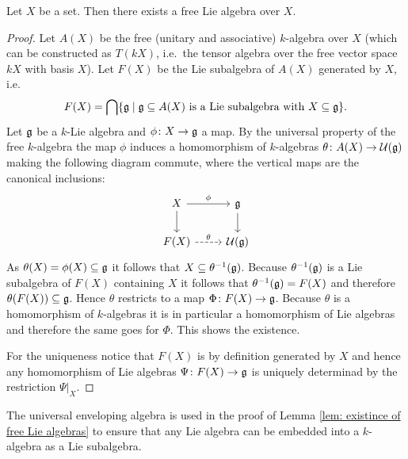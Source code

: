 \begin{lem}\label{lem: existince of free Lie algebras}
 Let $X$ be a set. Then there exists a free Lie algebra over $X$.
\end{lem}
\begin{proof}
 Let $A(X)$ be the free (unitary and associative) $k$-algebra over $X$ (which can be constructed as $T(kX)$, i.e.\ the tensor algebra over the free vector space $kX$ with basis $X$). Let $F(X)$ be the Lie subalgebra of $A(X)$ generated by $X$, i.e.
 \[
  F(X) = \bigcap \{\mathfrak{g} \mid \text{$\mathfrak{g} \subseteq A(X)$ is a Lie subalgebra with $X \subseteq \mathfrak{g}$}\}.
 \]
 Let $\mathfrak{g}$ be a $k$-Lie algebra and $\phi \colon X \to \mathfrak{g}$ a map. By the universal property of the free $k$-algebra the map $\phi$ induces a homomorphism of $k$-algebras $\theta \colon A(X) \to \mathcal{U}(\mathfrak{g})$ making the following diagram commute, where the vertical maps are the canonical inclusions:
 \[
   \begin{tikzcd}
     X
     \arrow{r}[above]{\phi}
     \arrow{d}
     &
     \g
     \arrow{d}
     \\
     F(X)
     \arrow[dashed]{r}[above]{\theta}
     &
     \Ue(\g)
   \end{tikzcd}
 \]
 As $\theta(X) = \phi(X) \subseteq \mathfrak{g}$ it follows that $X \subseteq \theta^{-1}(\mathfrak{g})$. Because $\theta^{-1}(\mathfrak{g})$ is a Lie subalgebra of $F(X)$ containing $X$ it follows that $\theta^{-1}(\mathfrak{g}) = F(X)$ and therefore $\theta(F(X)) \subseteq \mathfrak{g}$. Hence $\theta$ restricts to a map $\Phi \colon F(X) \to \mathfrak{g}$. Because $\theta$ is a homomorphism of $k$-algebras it is in particular a homomorphism of Lie algebras and therefore the same goes for $\Phi$. This shows the existence.
 
 For the uniqueness notice that $F(X)$ is by definition generated by $X$ and hence any homomorphism of Lie algebras $\Psi \colon F(X) \to \mathfrak{g}$ is uniquely determinad by the restriction $\Psi|_X$.
\end{proof}


\begin{rem}
 The universal enveloping algebra is used in the proof of Lemma \ref{lem: existince of free Lie algebras} to ensure that any Lie algebra can be embedded into a $k$-algebra as a Lie subalgebra.
\end{rem}


